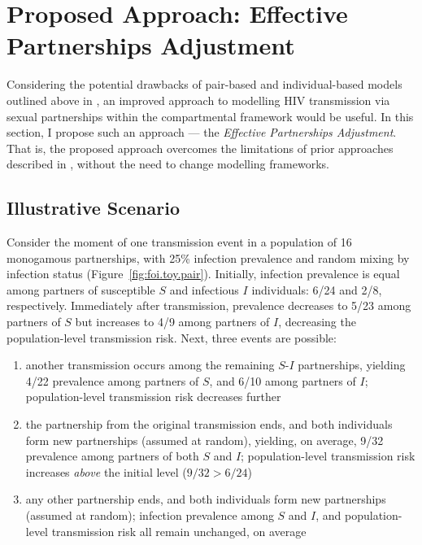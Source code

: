 \section{Proposed Approach: Effective Partnerships Adjustment}\label{foi.prop}
Considering the potential drawbacks of pair-based and individual-based models
outlined above in ,
an improved approach to modelling HIV transmission via sexual partnerships
within the compartmental framework would be useful.
In this section, I propose such an approach
--- the \emph{Effective Partnerships Adjustment}.
That is, the proposed approach
overcomes the limitations of prior approaches described in ,
without the need to change modelling frameworks.
\subsection{Illustrative Scenario}\label{foi.prop.toy}
Consider the moment of one transmission event
in a population of 16 monogamous partnerships, with 25\% infection prevalence
and random mixing by infection status (Figure~\ref{fig:foi.toy.pair}).
Initially, infection prevalence is equal among partners of
susceptible $S$ and infectious $I$ individuals: 6/24 and 2/8, respectively.
Immediately after transmission,
prevalence decreases to 5/23 among partners of $S$ but increases to 4/9 among partners of $I$,
decreasing the population-level transmission risk.
Next, three events are possible:
\begin{enumerate}[label=(\alph*)]
  \item \label{foi.toy.e.t}
  another transmission occurs among the remaining $S$-$I$ partnerships,
  yielding 4/22 prevalence among partners of $S$, and 6/10 among partners of $I$;
  population-level transmission risk decreases further
  \item \label{foi.toy.e.p}
  the partnership from the original transmission ends,
  and both individuals form new partnerships (assumed at random),
  yielding, on average, 9/32 prevalence among partners of both $S$ and $I$;
  population-level transmission risk increases \emph{above} the initial level ($9/32 > 6/24$)
  \item \label{foi.toy.e.q}
  any other partnership ends,
  and both individuals form new partnerships (assumed at random);
  infection prevalence among $S$ and $I$, and population-level transmission risk
  all remain unchanged, on average
\end{enumerate}

